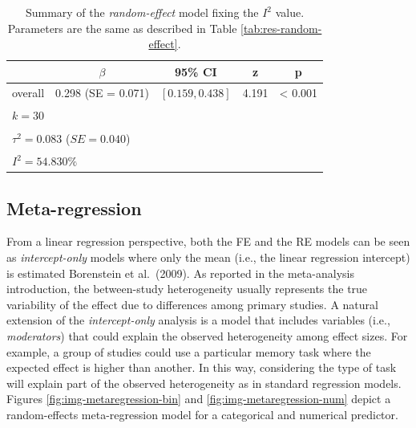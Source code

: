 \documentclass[
  man,floatsintext]{apa6}
\begin{document}
\begin{table}[H]

\caption{\label{tab:res-random-effect-i2}Summary of the \emph{random-effect} model fixing the \(I^2\) value. Parameters are the same as described in Table \ref{tab:res-random-effect}.}
\centering
\fontsize{9}{11}\selectfont
\begin{tabular}[t]{ccccc}
\toprule
 & $\beta$ & 95\% CI & z & p\\
\midrule
overall & 0.298 (SE = 0.071) & $[0.159, 0.438]$ & 4.191 & < 0.001\\
\bottomrule
\multicolumn{5}{l}{\textsuperscript{} $k = 30$}\\
\multicolumn{5}{l}{\textsuperscript{} $\tau^2 = 0.083$ ($SE = 0.040$)}\\
\multicolumn{5}{l}{\textsuperscript{} $I^2 = 54.830\%$}\\
\end{tabular}
\end{table}

\normalsize

\hypertarget{metareg}{%
\subsection{Meta-regression}\label{metareg}}

From a linear regression perspective, both the FE and the RE models can be seen as \emph{intercept-only} models where only the mean (i.e., the linear regression intercept) is estimated Borenstein et al.~(2009). As reported in the meta-analysis introduction, the between-study heterogeneity usually represents the true variability of the effect due to differences among primary studies. A natural extension of the \emph{intercept-only} analysis is a model that includes variables (i.e., \emph{moderators}) that could explain the observed heterogeneity among effect sizes. For example, a group of studies could use a particular memory task where the expected effect is higher than another. In this way, considering the
type of task will explain part of the observed heterogeneity as in standard regression models. Figures \ref{fig:img-metaregression-bin} and \ref{fig:img-metaregression-num} depict a random-effects meta-regression model for a categorical and numerical predictor.

\scriptsize
\end{document}
